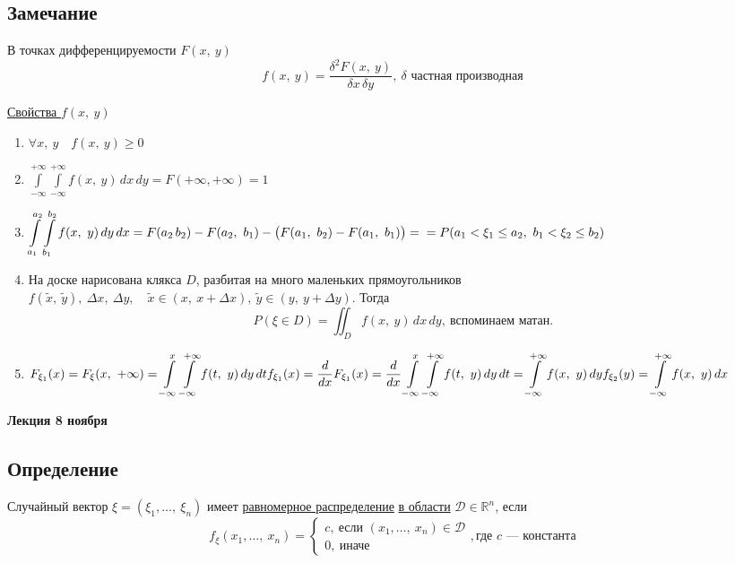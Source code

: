 \documentclass[12pt, a4paper]{article}
\begin{document}
    \subsection*{Замечание}
    В точках дифференцируемости $F(x,\ y)$
    \[f(x,\ y) = \frac{\delta^2 F(x,\ y)}{\delta x\, \delta y},\ \text{$\delta$ частная производная}\]
    \begin{center}
        \underline{Свойства $f(x,\ y)$}
    \end{center}
    \begin{enumerate}
        \item $\forall x,\ y\quad f(x,\ y) \geq 0$
        \item $\displaystyle \int\limits_{-\infty}^{+\infty}\int\limits_{-\infty}^{+\infty} f(x,\ y)\, dx\, dy = F(+\infty, +\infty) = 1$
        \item $\displaystyle \int\limits_{a_1}^{a_2} \int\limits_{b_1}^{b_2} f(x,\ y)\, dy\, dx = F(a_2\, b_2) - F(a_2,\ b_1) - \big(F(a_1,\ b_2) - F(a_1,\ b_1)\big) =\\
        = P(a_1 < \xi_1 \leq a_2,\ b_1 < \xi_2 \leq b_2)$
        \item На доске нарисована клякса $D$, разбитая на много маленьких прямоугольников\\
        $f(\tilde{x},\ \tilde{y}),\ \Delta x,\ \Delta y,\quad \tilde{x} \in (x,\ x + \Delta x),\ \tilde{y} \in (y,\ y + \Delta y)$. Тогда
        \[P(\xi \in D) = \iint_{D} f(x,\ y)\, dx\, dy,\ \text{вспоминаем матан.}\]
        \item $\displaystyle F_{\xi_1}(x) = F_{\xi}(x,\ +\infty) = \int\limits_{-\infty}^{x}\int\limits_{-\infty}^{+\infty} f(t,\ y)\, dy\, dt\\
        f_{\xi_1}(x) = \frac{d}{dx} F_{\xi_1}(x) = \frac{d}{dx} \int\limits_{-\infty}^{x}\int\limits_{-\infty}^{+\infty} f(t,\ y)\, dy\, dt = \int\limits_{-\infty}^{+\infty} f(x,\ y)\, dy\\
        f_{\xi_2}(y) = \int\limits_{-\infty}^{+\infty} f(x,\ y)\, dx$
    \end{enumerate}
    \begin{center}
        \bf Лекция 8 ноября
    \end{center}
    \subsection*{Определение}
    Случайный вектор $\xi = (\xi_1,\dots,\ \xi_n)$ имеет \underline{равномерное распределение} \underline{в области} $\mathcal{D}\in \mathbb{R}^n$, если 
    \[f_{\xi}(x_1,\dots,\ x_n) = \begin{cases}
        c,\ \text{если } (x_1,\dots,\ x_n)\in \mathcal{D}\\
        0,\ \text{иначе}
    \end{cases}, \text{где $c$ --- константа}\]
\end{document}
